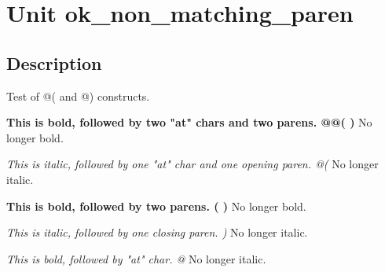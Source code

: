\documentclass{report}
\begin{document}
\newlength{\tmplength}
\chapter{Unit ok{\_}non{\_}matching{\_}paren}
\section{Description}
Test of @( and @) constructs.\hfill\vspace*{1ex}



\textbf{This is bold, followed by two "at" chars and two parens. @@( ) } No longer bold.

\textit{This is italic, followed by one "at" char and one opening paren. @( } No longer italic.

\textbf{This is bold, followed by two parens. ( ) } No longer bold.

\textit{This is italic, followed by one closing paren. ) } No longer italic.

\textit{This is bold, followed by "at" char. @} No longer italic.
\end{document}
